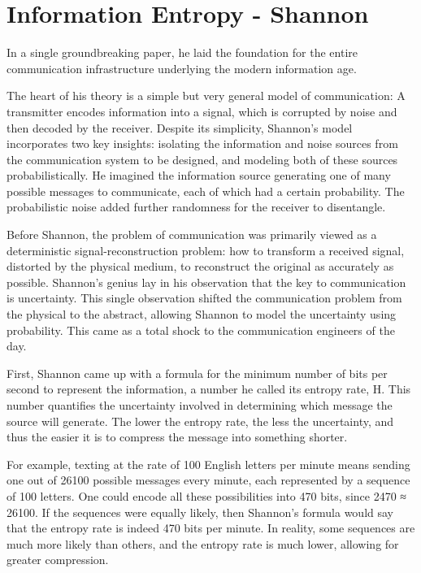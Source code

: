 \documentclass[
]{book}
\begin{document}
\hypertarget{information-entropy---shannon}{%
\section{Information Entropy - Shannon}\label{information-entropy---shannon}}

In a single groundbreaking paper, he laid the foundation for the entire communication infrastructure underlying the modern information age.

The heart of his theory is a simple but very general model of communication: A transmitter encodes information into a signal, which is corrupted by noise and then decoded by the receiver. Despite its simplicity, Shannon's model incorporates two key insights: isolating the information and noise sources from the communication system to be designed, and modeling both of these sources probabilistically. He imagined the information source generating one of many possible messages to communicate, each of which had a certain probability. The probabilistic noise added further randomness for the receiver to disentangle.

Before Shannon, the problem of communication was primarily viewed as a deterministic signal-reconstruction problem: how to transform a received signal, distorted by the physical medium, to reconstruct the original as accurately as possible. Shannon's genius lay in his observation that the key to communication is uncertainty.
This single observation shifted the communication problem from the physical to the abstract, allowing Shannon to model the uncertainty using probability. This came as a total shock to the communication engineers of the day.

First, Shannon came up with a formula for the minimum number of bits per second to represent the information, a number he called its entropy rate, H. This number quantifies the uncertainty involved in determining which message the source will generate. The lower the entropy rate, the less the uncertainty, and thus the easier it is to compress the message into something shorter.

For example, texting at the rate of 100 English letters per minute means sending one out of 26100 possible messages every minute, each represented by a sequence of 100 letters. One could encode all these possibilities into 470 bits, since 2470 ≈ 26100. If the sequences were equally likely, then Shannon's formula would say that the entropy rate is indeed 470 bits per minute. In reality, some sequences are much more likely than others, and the entropy rate is much lower, allowing for greater compression.
\end{document}
